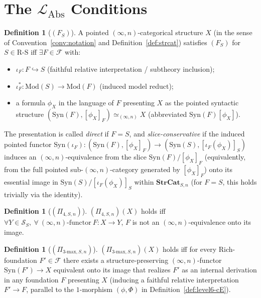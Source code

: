 \documentclass[11pt]{article}
\theoremstyle{plain}
\theoremstyle{definition}
\newtheorem{definition}[theorem]{Definition}
\newcommand{\RS}{\mathrm{R\text{-}S}}
\newcommand{\cS}{\mathcal{S}}
\newcommand{\cF}{\mathcal{F}}
\newcommand{\LAbs}{\mathcal{L}_{\mathrm{Abs}}}
\newcommand{\Syn}{\mathrm{Syn}}
\newcommand{\Mod}{\mathrm{Mod}}
\begin{document}
\section{\texorpdfstring{The $\LAbs$ Conditions}{The L\_Abs Conditions}}\label{sec:conditions}

\begin{definition}[$(F_S)$]\label{def:F}
A pointed $(\infty, n)$-categorical structure $X$ (in the sense of Convention~\ref{conv:notation} and Definition~\ref{def:strcat}) satisfies $(F_S)$ for $S \in \RS$ iff $\exists F \in \cF$ with:
\begin{itemize}
\item[\textbf{(F-1)}] $\iota_F : F \hookrightarrow S$ (faithful relative interpretation / subtheory inclusion);
\item[\textbf{(F-2)}] $\iota_F^* : \Mod(S) \to \Mod(F)$ (induced model reduct);
\item[\textbf{(F-3)}] a formula $\phi_X$ in the language of $F$ presenting $X$ as the pointed syntactic structure $(\Syn(F), [\phi_X]_F) \simeq_{(\infty, n)} X$ (abbreviated $\Syn(F)[\phi_X]$).
\end{itemize}
The presentation is called \emph{direct} if $F = S$, and \emph{slice-conservative} if the induced pointed functor $\Syn(\iota_F) : (\Syn(F), [\phi_X]_F) \to (\Syn(S), [\iota_F(\phi_X)]_S)$ induces an $(\infty, n)$-equivalence from the slice $\Syn(F)/[\phi_X]_F$ (equivalently, from the full pointed sub-$(\infty, n)$-category generated by $[\phi_X]_F$) onto its essential image in $\Syn(S)/[\iota_F(\phi_X)]_S$ within $\mathbf{StrCat}_{S, n}$ (for $F = S$, this holds trivially via the identity).
\end{definition}

\begin{definition}[$(\Pi_{4, S, n})$]\label{def:pi4}
$(\Pi_{4, S, n})(X)$ holds iff $\forall Y \in \cS_S,\ \forall\ (\infty, n)\text{-functor}\ F : X \to Y$, $F$ is not an $(\infty, n)$-equivalence onto its image.
\end{definition}

\begin{definition}[$(\Pi_{3\text{-max}, S, n})$]\label{def:pi3max}
$(\Pi_{3\text{-max}, S, n})(X)$ holds iff for every Rich-foundation $F' \in \cF$ there exists a structure-preserving $(\infty, n)$-functor $\Syn(F') \to X$ equivalent onto its image that realizes $F'$ as an internal derivation in any foundation $F$ presenting $X$ (inducing a faithful relative interpretation $F' \to F$, parallel to the $1$-morphism $(\phi, \Phi)$ in Definition~\ref{def:level6-cE}).
\end{definition}
\end{document}
